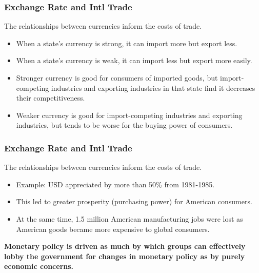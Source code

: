 \documentclass[handout]{beamer}
\begin{document}
\begin{frame} 
	\frametitle{\LARGE{Exchange Rate and Intl Trade}}
The relationships between currencies inform the costs of trade. \pause
	\begin{itemize}
		\item When a state's currency is strong, it can import more but export less. \pause
		\item When a state's currency is weak, it can import less but export more easily.
		\item Stronger currency is good for consumers of imported goods, but import-competing industries and exporting industries in that state find it decreases their competitiveness. \pause
		\item Weaker currency is good for import-competing industries and exporting industries, but tends to be worse for the buying power of consumers. 
	\end{itemize}

\end{frame}

\begin{frame} 
	\frametitle{\LARGE{Exchange Rate and Intl Trade}}
	The relationships between currencies inform the costs of trade. \pause
	\begin{itemize}
		\item Example: USD appreciated by more than 50\% from 1981-1985.
		\item This led to greater prosperity (purchasing power) for American consumers. 
		\item At the same time, 1.5 million American manufacturing jobs were lost as American goods became more expensive to global consumers. \pause 
	\end{itemize}
	\textbf{Monetary policy is driven as much by which groups can effectively lobby the government for changes in monetary policy as by purely economic concerns.}	
\end{frame}
\end{document}
